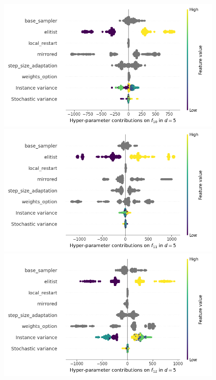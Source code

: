 \begin{figure}[t]
	\includegraphics[height=0.15\textheight,trim=60mm 0mm 30mm 0mm,clip]{images/img_summary_f10_d5.png}
	\includegraphics[height=0.15\textheight,trim=60mm 0mm 30mm 0mm,clip]{images/img_summary_f11_d5.png}
	\includegraphics[height=0.15\textheight,trim=60mm 0mm 0mm 0mm,clip]{images/img_summary_f12_d5.png}

\end{figure}

